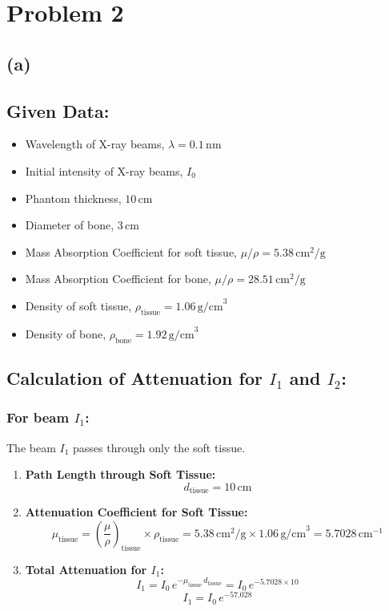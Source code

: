 \documentclass[12pt]{article}
\begin{document}
\newpage
\section*{Problem 2}
\subsection*{(a)}
\subsection*{Given Data:}
\begin{itemize}
    \item Wavelength of X-ray beams, $\lambda = 0.1 \, \text{nm}$
    \item Initial intensity of X-ray beams, $I_0$
    \item Phantom thickness, $10 \, \text{cm}$
    \item Diameter of bone, $3 \, \text{cm}$
    \item Mass Absorption Coefficient for soft tissue, $\mu/\rho = 5.38 \, \text{cm}^2/\text{g}$
    \item Mass Absorption Coefficient for bone, $\mu/\rho = 28.51 \, \text{cm}^2/\text{g}$
    \item Density of soft tissue, $\rho_{\text{tissue}} = 1.06 \, \text{g/cm}^3$
    \item Density of bone, $\rho_{\text{bone}} = 1.92 \, \text{g/cm}^3$
\end{itemize}

\subsection*{Calculation of Attenuation for $I_1$ and $I_2$:}

\subsubsection*{For beam $I_1$:}
The beam $I_1$ passes through only the soft tissue.

\begin{enumerate}
    \item \textbf{Path Length through Soft Tissue:}
    \[
    d_{\text{tissue}} = 10 \, \text{cm}
    \]

    \item \textbf{Attenuation Coefficient for Soft Tissue:}
    \[
    \mu_{\text{tissue}} = \left(\frac{\mu}{\rho}\right)_{\text{tissue}} \times \rho_{\text{tissue}} = 5.38 \, \text{cm}^2/\text{g} \times 1.06 \, \text{g/cm}^3 = 5.7028 \, \text{cm}^{-1}
    \]

    \item \textbf{Total Attenuation for $I_1$:}
    \[
    I_1 = I_0 \, e^{-\mu_{\text{tissue}} \, d_{\text{tissue}}} = I_0 \, e^{-5.7028 \times 10}
    \]
    \[
    I_1 = I_0 \, e^{-57.028}
    \]
\end{enumerate}
\end{document}
